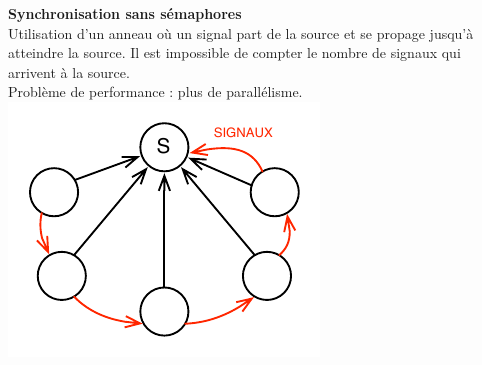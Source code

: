 \documentclass[french]{scrartcl}
\makeatletter
\newenvironment{figurehere}
  {\def\@captype{figure}}
  {}
\makeatother
\begin{document}
\begin{multicols}{3}
\vskip 5pt
\textbf{Synchronisation sans sémaphores}\\
Utilisation d'un anneau où un signal part de la source et se propage jusqu'à atteindre la source. Il est impossible de compter le nombre de signaux qui arrivent à la source.\\
Problème de performance : plus de parallélisme.
\begin{figurehere}
    \includegraphics[scale=.7]{images/anneau}
\end{figurehere}

\end{multicols}
\end{document}
